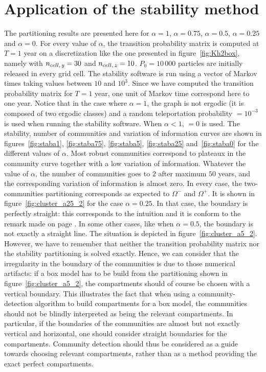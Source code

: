 \section{Application of the stability method}
The partitioning results are presented here for $\alpha = 1$, $\alpha = 0.75$, $\alpha = 0.5$, $\alpha = 0.25$ and $\alpha = 0$. For every value of $\alpha$, the transition probability matrix is computed at $T = 1$ year on a discretization like the one presented in figure~\ref{fig:Kh2box}, namely with $n_{cell,\,y} = 30$ and $n_{cell,\,z} = 10$. $P_0 = 10\,000$ particles are initially released in every grid cell. The stability software is run using a vector of Markov times taking values between $10$ and $10^3$. Since we have computed the transition probability matrix for $T = 1$ year, one unit of Markov time correspond here to one year. Notice that in the case where $\alpha = 1$, the graph is not ergodic (it is composed of two ergodic classes) and a random teleportation probability  $= 10^{-3}$ is used when running the stability software. When $\alpha < 1$,  $=0$ is used.
The stability, number of communities and variation of information curves are shown in figures~\ref{fig:staba1}, \ref{fig:staba75}, \ref{fig:staba5}, \ref{fig:staba25} and~\ref{fig:staba0} for the different values of $\alpha$. Most robust communities correspond to plateaux in the community curve together with a low variation of information. Whatever the value of $\alpha$, the number of communities goes to $2$ after maximum $50$ years, and the corresponding variation of information is almost zero. In every case, the two-communities partitioning corresponds as expected to $\Omega^-$ and $\Omega^+$. It is shown in figure~\ref{fig:cluster_a25_2} for the case $\alpha = 0.25$. In that case, the boundary is perfectly straight: this corresponds to the intuition and it is conform to the remark made on page \pageref{remark:straightboundaries}. In some other cases, like when $\alpha = 0.5$, the boundary is not exactly a straight line. The situation is depicted in figure~\ref{fig:cluster_a5_2}. However, we have to remember that neither the transition probability matrix nor the stability partitioning is solved exactly. Hence, we can consider that the irregularity in the boundary of the communities is due to those numerical artifacts: if a box model has to be build from the partitioning shown in figure~\ref{fig:cluster_a5_2}, the compartments should of course be chosen with a vertical boundary. This illustrates the fact that when using a community-detection algorithm to build compartments for a box model, the communities should not be blindly interpreted as being the relevant compartments. In particular, if the boundaries of the communities are almost but not exactly vertical and horizontal, one should consider straight boundaries for the compartments. Community detection should thus be considered as a guide towards choosing relevant compartments, rather than as a method providing the exact perfect compartments.

